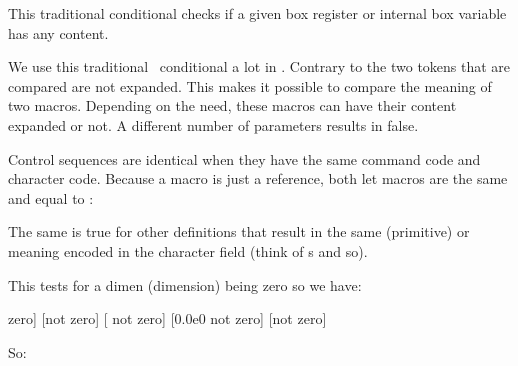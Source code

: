 \stopoldprimitive

\startoldprimitive[title={\prm {ifvoid}}]

This traditional conditional checks if a given box register or internal box
variable has any content.

\stopoldprimitive

\startoldprimitive[title={\prm {ifx}}]

We use this traditional \TEX\ conditional a lot in \CONTEXT. Contrary to 
the two tokens that are compared are not expanded. This makes it possible to compare
the meaning of two macros. Depending on the need, these macros can have their content
expanded or not. A different number of parameters results in false.

Control sequences are identical when they have the same command code and
character code. Because a  macro is just a reference, both let macros
are the same and equal to :

\starttyping
\let\one\relax \let\two\relax
\stoptyping

The same is true for other definitions that result in the same (primitive) or
meaning encoded in the character field (think of s and so).

\stopoldprimitive

\startnewprimitive[title={\prm {ifzerodim}}]

This tests for a dimen (dimension) being zero so we have:

\starttyping
\ifdim<dimension>=0pt
\ifzerodim<dimension>
\ifcase<dimension register>
\stoptyping

\stopnewprimitive

\startnewprimitive[title={\prm {ifzerofloat}}]

As the name indicated, this tests for a zero float value.

\startbuffer
[\scratchfloat\zerofloat \ifzerofloat\scratchfloat \else not \fi zero]
[\scratchfloat\plusone   \ifzerofloat\scratchfloat \else not \fi zero]
[      \ifzerofloat\scratchfloat \else not \fi zero]
[\scratchfloat 0.0e0     \ifzerofloat\scratchfloat \else not \fi zero]
[\scratchfloat \zeropoint\ifzerofloat\scratchfloat \else not \fi zero]
\stopbuffer

\typebuffer

So: \inlinebuffer

\stopnewprimitive

\startnewprimitive[title={\prm {ifzeronum}}]

